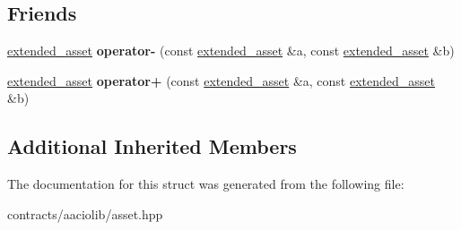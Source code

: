 \subsection*{Friends}
\begin{DoxyCompactItemize}
\item 
\mbox{\label{structaacio_1_1extended__asset_ab4d2266e6f926377337a626e990a5e7c}} 
\mbox{\hyperlink{structaacio_1_1extended__asset}{extended\+\_\+asset}} {\bfseries operator-\/} (const \mbox{\hyperlink{structaacio_1_1extended__asset}{extended\+\_\+asset}} \&a, const \mbox{\hyperlink{structaacio_1_1extended__asset}{extended\+\_\+asset}} \&b)
\item 
\mbox{\label{structaacio_1_1extended__asset_a407c4e55064a39fa993303aa2d428244}} 
\mbox{\hyperlink{structaacio_1_1extended__asset}{extended\+\_\+asset}} {\bfseries operator+} (const \mbox{\hyperlink{structaacio_1_1extended__asset}{extended\+\_\+asset}} \&a, const \mbox{\hyperlink{structaacio_1_1extended__asset}{extended\+\_\+asset}} \&b)
\end{DoxyCompactItemize}
\subsection*{Additional Inherited Members}


The documentation for this struct was generated from the following file\+:\begin{DoxyCompactItemize}
\item 
contracts/aaciolib/asset.\+hpp\end{DoxyCompactItemize}
